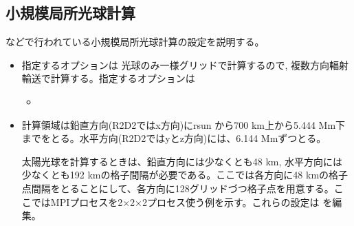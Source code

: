 \documentclass[letterpaper,10pt,dvipdfmx,report]{sphinxmanual}
\begin{document}
\subsection{小規模局所光球計算}
\label{\detokenize{typical_case:id3}}
\sphinxAtStartPar
{} などで行われている小規模局所光球計算の設定を説明する。
\begin{itemize}
\item {} \begin{description}
\sphinxAtStartPar
指定するオプションは
光球のみ一様グリッドで計算するので, 複数方向輻射輸送で計算する。指定するオプションは
\begin{itemize}
\item {} 
\sphinxAtStartPar
{}

\end{itemize}

\end{description}

\item {} \begin{description}
\sphinxAtStartPar
計算領域は鉛直方向(R2D2ではx方向)にrsun から700 km上から5.444 Mm下までをとる。水平方向(R2D2ではyとz方向)には、6.144 Mmずつとる。

\sphinxAtStartPar
太陽光球を計算するときは、鉛直方向には少なくとも48 km, 水平方向には少なくとも192 kmの格子間隔が必要である。ここでは各方向に48 kmの格子点間隔をとることにして、各方向に128グリッドづつ格子点を用意する。ここではMPIプロセスを2×2×2プロセス使う例を示す。これらの設定は  を編集。

\begin{sphinxVerbatim}[commandchars=\\\{\}]


\end{sphinxVerbatim}
\end{description}
\end{itemize}
\end{document}
